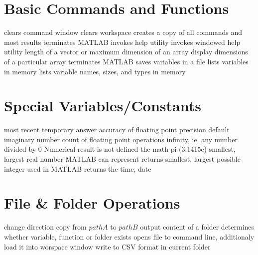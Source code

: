 
\def\content{\uppercase{MatLab}}
\def\shortcontent{\content}
\def\versionnumber{0.2}  %
\def\version{v\versionnumber\ \month\ \year}


\mytitle

\shortintro

\section{Basic Commands and Functions}{}
	{clears command window}
	{clears workspace}
	{creates a copy of all commands and most results}
	{terminates MATLAB}
	{invokes help utility}
	{invokes windowed help utility}
	{length of a vector or maximum dimension of an array}
	{display dimensions of a particular array}
	{terminates MATLAB}
	{saves variables in a file}
	{lists  variables in memory}
	{lists  variable names, sizes, and types in memory}

\section{Special Variables/Constants}{}
	{most recent temporary answer}
	{accuracy of floating point precision}
	{default}
	{imaginary number}
	{count of floating point operations}
	{infinity, ie. any number divided by 0}
	{Numerical result is not defined}
	{the math pi (3.1415e)}
	{smallest, largest real number MATLAB can represent}
	{returns smallest, largest possible integer used in MATLAB}
	{returns the time, date}

\section{File \& Folder Operations}{}
	{change direction}
	{copy from $pathA$ to $pathB$}
	{output content of a folder}
	{determines whether variable, function or folder exists}
	{opens file to command
    line, additionaly load it into worspace window}
	{write to CSV format in current folder}

